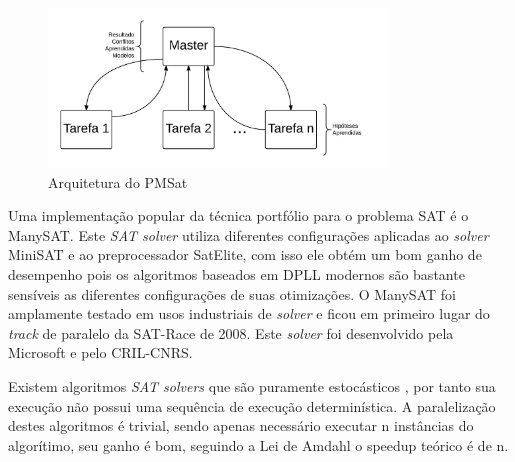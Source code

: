 \documentclass{ufsc-thesis}
\begin{document}
\begin{figure}[H]
    \centering
    \includegraphics[width=0.8\textwidth]{figuras/PMSat.jpeg}
    \caption{Arquitetura do PMSat}
    \label{fig:PMSat}
\end{figure}


%

Uma implementação popular da técnica portfólio para o problema SAT é o ManySAT\cite{Hamadi09manysat}. 
Este \textit{SAT solver} utiliza diferentes configurações aplicadas ao \textit{solver} 
MiniSAT e ao preprocessador SatElite, com isso ele obtém um bom ganho de desempenho 
pois os algoritmos baseados em DPLL modernos são bastante sensíveis as diferentes 
configurações de suas otimizações. O ManySAT foi amplamente testado em usos industriais 
de \textit{solver} e ficou em primeiro lugar do \textit{track} de paralelo da SAT-Race de 2008.
Este \textit{solver} foi desenvolvido pela Microsoft e pelo CRIL-CNRS.

Existem algoritmos \textit{SAT solvers} que são puramente estocásticos\allowbreak\cite{pprobSAT}
, por tanto sua execução não possui uma sequência de execução determinística. 
A paralelização destes algoritmos é trivial, sendo apenas necessário executar n 
instâncias do algorítimo, seu ganho é bom, seguindo a Lei de Amdahl o speedup 
teórico é de n.
\end{document}
